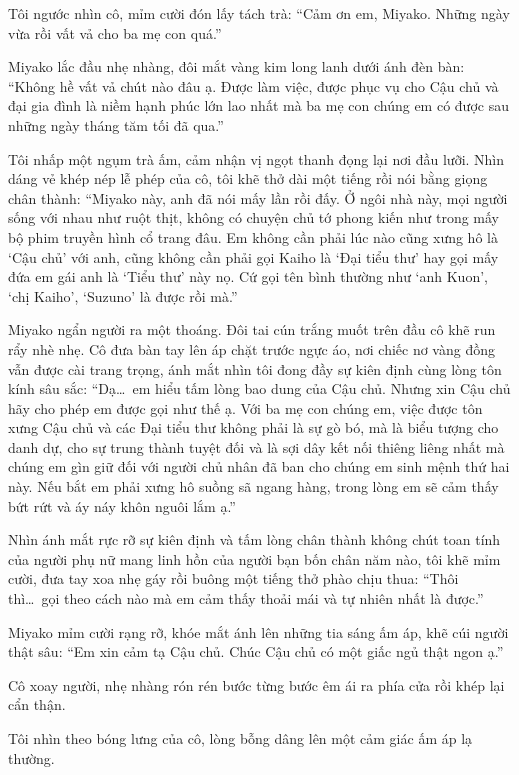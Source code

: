 \documentclass[../main.tex]{subfiles}
\begin{document}
Tôi ngước nhìn cô, mỉm cười đón lấy tách trà: ``Cảm ơn em, Miyako. Những ngày vừa rồi vất vả cho ba mẹ con quá.''

Miyako lắc đầu nhẹ nhàng, đôi mắt vàng kim long lanh dưới ánh đèn bàn: ``Không hề vất vả chút nào đâu ạ. Được làm việc, được phục vụ cho Cậu chủ và đại gia đình là niềm hạnh phúc lớn lao nhất mà ba mẹ con chúng em có được sau những ngày tháng tăm tối đã qua.''

Tôi nhấp một ngụm trà ấm, cảm nhận vị ngọt thanh đọng lại nơi đầu lưỡi. Nhìn dáng vẻ khép nép lễ phép của cô, tôi khẽ thở dài một tiếng rồi nói bằng giọng chân thành: ``Miyako này, anh đã nói mấy lần rồi đấy. Ở ngôi nhà này, mọi người sống với nhau như ruột thịt, không có chuyện chủ tớ phong kiến như trong mấy bộ phim truyền hình cổ trang đâu. Em không cần phải lúc nào cũng xưng hô là `Cậu chủ' với anh, cũng không cần phải gọi Kaiho là `Đại tiểu thư' hay gọi mấy đứa em gái anh là `Tiểu thư' này nọ. Cứ gọi tên bình thường như `anh Kuon', `chị Kaiho', `Suzuno' là được rồi mà.''

Miyako ngẩn người ra một thoáng. Đôi tai cún trắng muốt trên đầu cô khẽ run rẩy nhè nhẹ. Cô đưa bàn tay lên áp chặt trước ngực áo, nơi chiếc nơ vàng đồng vẫn được cài trang trọng, ánh mắt nhìn tôi đong đầy sự kiên định cùng lòng tôn kính sâu sắc: ``Dạ\dots\ em hiểu tấm lòng bao dung của Cậu chủ. Nhưng xin Cậu chủ hãy cho phép em được gọi như thế ạ. Với ba mẹ con chúng em, việc được tôn xưng Cậu chủ và các Đại tiểu thư không phải là sự gò bó, mà là biểu tượng cho danh dự, cho sự trung thành tuyệt đối và là sợi dây kết nối thiêng liêng nhất mà chúng em gìn giữ đối với người chủ nhân đã ban cho chúng em sinh mệnh thứ hai này. Nếu bắt em phải xưng hô suồng sã ngang hàng, trong lòng em sẽ cảm thấy bứt rứt và áy náy khôn nguôi lắm ạ.''

Nhìn ánh mắt rực rỡ sự kiên định và tấm lòng chân thành không chút toan tính của người phụ nữ mang linh hồn của người bạn bốn chân năm nào, tôi khẽ mỉm cười, đưa tay xoa nhẹ gáy rồi buông một tiếng thở phào chịu thua:  ``Thôi thì\dots\ gọi theo cách nào mà em cảm thấy thoải mái và tự nhiên nhất là được.''

Miyako mỉm cười rạng rỡ, khóe mắt ánh lên những tia sáng ấm áp, khẽ cúi người thật sâu: ``Em xin cảm tạ Cậu chủ. Chúc Cậu chủ có một giấc ngủ thật ngon ạ.''

Cô xoay người, nhẹ nhàng rón rén bước từng bước êm ái ra phía cửa rồi khép lại cẩn thận.

Tôi nhìn theo bóng lưng của cô, lòng bỗng dâng lên một cảm giác ấm áp lạ thường.
\end{document}
